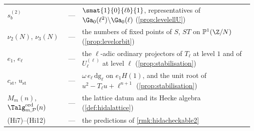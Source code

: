 \begin{center}
\begin{longtable}{@{}p{}p{}p{}@{}}
$s^{(2)}_b$ & --- & $\smat{1}{0}{\ell b}{1}$, representatives of $\Ga_0(\ell^{2})\backslash\Ga_0(\ell)$ (\ref{prop:levelellU}) \\
$\nu_2(N)$, $\nu_3(N)$ & --- & the numbers of fixed points of $S$, $ST$ on $\mathbb{P}^1(\Z/N)$ (\ref{prop:levelorbit}) \\
$e_1$, $e_\ell$ & --- & the $\ell$-adic ordinary projectors of $T_\ell$ at level $1$ and of $U^{(\ell)}_\ell$ at level $\ell$ (\ref{prop:stabilisation}) \\
$c_{\mathrm{st}}$, $u_{\mathrm{st}}$ & --- & $\omega\,e_\ell\,\mathrm{dg}_\ell$ on $e_1H(1)$, and the unit root of $u^{2}-T_\ell u+\ell^{n+1}$ (\ref{prop:stabilisation}) \\
$M_m(n)$, $\Talg^{\mathrm{ord}}_{m,\mathcal P}(n)$ & --- & the lattice datum and its Hecke algebra (\ref{def:hidalattice}) \\
(Hi7)--(Hi12) & --- & the predictions of \ref{rmk:hidacheckable2} \\
\bottomrule
\end{longtable}
\end{center}
